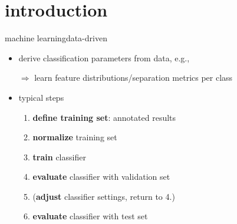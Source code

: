     \section[intro]{introduction}
        \begin{frame}{machine learning}{data-driven}
           \begin{itemize}
                \item   derive classification parameters from data, e.g.,
                \item[$\Rightarrow$]  learn feature distributions/separation metrics per class
                \bigskip
                \item  typical steps
                    \begin{enumerate}
                        \item	\textbf{define training set}: annotated results
                        \smallskip
                        \item<2->	\textbf{normalize} training set
                        \smallskip
                        \item<3->	\textbf{train} classifier
                        \smallskip
                        \item<4->	\textbf{evaluate} classifier with validation set
                        \smallskip
                        \item<5->	(\textbf{adjust} classifier settings, return to 4.)
                        \smallskip
                        \item<6->	\textbf{evaluate} classifier with test set
                    \end{enumerate}
            \end{itemize}
        \end{frame}

